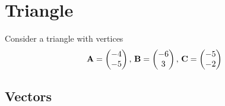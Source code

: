 \documentclass[11pt]{book}
\begin{document}
\frontmatter



\tableofcontents

\setcounter{page}{1}

\mainmatter

\chapter{Triangle}
Consider a triangle with vertices
\begin{align}
\mathbf{A} = \begin{pmatrix} -4 \\ -5\end{pmatrix},\,
\mathbf{B} = \begin{pmatrix}-6 \\ 3\end{pmatrix},\,
\mathbf{C} = \begin{pmatrix}-5 \\ -2\end{pmatrix}
\end{align}

\section{Vectors}
\end{document}
